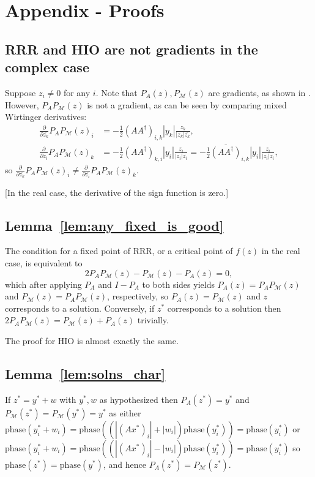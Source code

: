 \documentclass[12pt]{article}
\theoremstyle{definition}
\theoremstyle{remark}
\theoremstyle{definition}
\theoremstyle{problem}
\theoremstyle{definition}
\newcommand{\phase}{\text{phase}}
\newcommand{\MM}{\mathcal{M}}
\begin{document}



\appendix
\section{Appendix - Proofs}

\subsection{RRR and HIO are not gradients in the complex case}\label{sec:complex_not_grads}
Suppose $z_i\neq 0$ for any $i$. Note that $P_A(z),P_{\MM}(z)$ are gradients, as shown in \cite{Marchesini2007}. However, $P_AP_{\MM}(z)$ is not a gradient, as can be seen by comparing mixed Wirtinger derivatives:
\[\begin{aligned} \frac{\partial}{\partial \overline{z_k}}P_AP_{\MM}(z)_i &= -\frac{1}{2}(AA^{\dagger})_{i,k}|y_k|\frac{z_k}{|z_k|\overline{z_k}},\\
\frac{\partial}{\partial \overline{z_i}}P_AP_{\MM}(z)_k &= -\frac{1}{2}(AA^{\dagger})_{k,i}|y_i|\frac{z_i}{|z_i|\overline{z_i}} = -\frac{1}{2}\overline{(AA^{\dagger})}_{i,k}|y_i|\frac{z_i}{|z_i|\overline{z_i}},\end{aligned}\]
so $\frac{\partial}{\partial \overline{z_k}}P_AP_{\MM}(z)_i\neq \frac{\partial}{\partial \overline{z_i}}P_AP_{\MM}(z)_k$. 

[In the real case, the derivative of the sign function is zero.]

\subsection{Lemma~\ref{lem:any_fixed_is_good}}\label{sec:pf_any_fixed_good}
The condition for a fixed point of RRR, or a critical point of $f(z)$ in the real case, is equivalent to
\[ 2P_AP_{\MM}(z) - P_{\MM}(z) - P_A(z) = 0,\]
which after applying $P_A$ and $I-P_A$ to both sides yields $P_A(z) = P_AP_{\MM}(z)$ and $P_{\MM}(z) = P_AP_{\MM}(z)$, respectively, so $P_A(z)=P_{\MM}(z)$ and $z$ corresponds to a solution. Conversely, if $z^*$ corresponds to a solution then $2P_AP_{\MM}(z) = P_{\MM}(z) + P_A(z)$ trivially.

The proof for HIO is almost exactly the same.

\subsection{Lemma~\ref{lem:solns_char}}\label{sec:pf_solns_char}
If $z^* = y^*+w$ with $y^*,w$ as hypothesized then $P_A(z^*)=y^*$ and $P_{\MM}(z^*) = P_{\MM}(y^*)=y^*$ as either $\phase(y^*_i+w_i) = \phase((|(Ax^*)_i|+|w_i|)\phase(y^*_i))=\phase(y^*_i)$ or $\phase(y^*_i+w_i) = \phase((|(Ax^*)_i|-|w_i|)\phase(y^*_i))=\phase(y^*_i)$ so $\phase(z^*)=\phase(y^*)$, and hence $P_A(z^*)=P_{\MM}(z^*)$.
\end{document}
